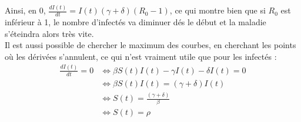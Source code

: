 \documentclass{article}
\begin{document}
	Ainsi, en $0$, $\frac{dI(t)}{dt} = I(t)(\gamma + \delta)(R_0 - 1)$, ce qui montre bien que si $R_0$ est inférieur à 1, le nombre d'infectés va diminuer dés le début et la maladie s'éteindra alors très vite.\\[0.2cm]
	
	Il est aussi possible de chercher le maximum des courbes, en cherchant les points où les dérivées s'annulent, ce qui n'est vraiment utile que pour les infectés : 
	\begin{align*}
		\frac{dI(t)}{dt} = 0 &\Leftrightarrow \beta S(t)I(t) - \gamma I(t) - \delta I(t) = 0 \\
		                     &\Leftrightarrow \beta S(t)I(t) = (\gamma + \delta) I(t) \\
		                     &\Leftrightarrow S(t) = \frac{(\gamma + \delta)}{\beta} \\
		                     &\Leftrightarrow S(t) = \rho
	\end{align*}
\end{document}
